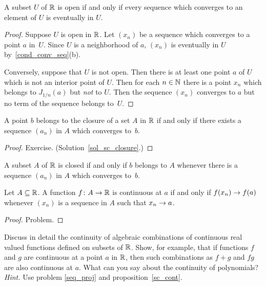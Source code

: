 \begin{prop}\label{sc_open} A subset $U$ of $\mathbb{R}$ is open if and only if every sequence which
converges to an element of $U$ is eventually in $U$.
\end{prop}

\begin{proof} Suppose $U$ is open in $\mathbb{R}$.  Let $(x_n)$ be a sequence which converges to a point
$a$ in~$U$.  Since $U$ is a neighborhood of $a$, $(x_n)$ is eventually in $U$
by~\ref{cond_conv_seq}(b).

Conversely, suppose that $U$ is not open.  Then there is at least one point $a$ of $U$ which
is not an interior point of $U$.  Then for each $n \in \mathbb{N}$ there is a point $x_n$ which
belongs to $J_{1/n}(a)$ but \emph{not} to $U$.  Then the sequence $(x_n)$ converges to $a$ but
no term of the sequence belongs to~$U$.
\end{proof}

\begin{prop}\label{sc_closure} A point $b$ belongs to the closure of a set $A$ in $\mathbb{R}$ if and
only if there exists a sequence $(a_n)$ in $A$ which converges to~$b$.
\end{prop}

\begin{proof} Exercise. (Solution~\ref{sol_sc_closure}.)   \ns   \end{proof}

\begin{cor}\label{sc_closed} A subset $A$ of $\mathbb{R}$ is closed if and only if $b$ belongs to $A$
whenever there is a sequence $(a_n)$ in $A$ which converges to~$b$.
\end{cor}

\begin{prop}\label{sc_cont} Let $A \subseteq \mathbb{R}$. A function $f \colon A \rightarrow \mathbb{R}$ is continuous
at $a$ if and only if $f(x_n) \rightarrow f(a)$ whenever $(x_n)$ is a sequence in $A$ such that $x_n
\rightarrow a$.
\end{prop}

\begin{proof} Problem.  \ns  \end{proof}

\begin{prob} Discuss in detail the continuity of algebraic combinations of continuous real valued
functions defined on subsets of $\mathbb{R}$.  Show, for example, that if functions $f$ and $g$ are
continuous at a point $a$ in $\mathbb{R}$, then such combinations as $f+g$ and $fg$ are also
continuous at $a$.  What can you say about the continuity of polynomials?  \emph{Hint.}  Use
problem \ref{seq_proj} and proposition~\ref{sc_cont}.
\end{prob}

